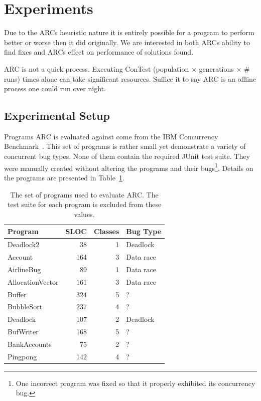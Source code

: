 \documentclass[10pt, conference, compsocconf]{IEEEtran}
\begin{document}
\section{Experiments}
\label{sec:experiments}

Due to the ARCs heuristic nature it is entirely possible for a program to perform better or worse then it did originally. We are interested in both
ARCs ability to find fixes and ARCs effect on performance of solutions found.

ARC is not a quick process.  Executing ConTest (population $\times$ generations $\times$ \# runs) times alone can take significant resources. Suffice it to say ARC is an offline process one could run over night.

\subsection{Experimental Setup}
\label{sec:experimental_setup}

Programs ARC is evaluated against come from the IBM Concurrency Benchmark~\cite{EHSU06}. This set of programs is rather small yet demonstrate a variety of concurrent bug types. None of them contain the required JUnit test suite.  They were manually created without altering the programs and their bugs\footnote{One incorrect program was fixed so that it properly exhibited its concurrency bug.}. Details on the programs are presented in Table~\ref{tbl:used_programs}.

\begin{table}[!h]
\begin{center}
\begin{tabular}{|l|r|r|l|}
\hline
\textbf{Program} &
\textbf{SLOC} &
\textbf{Classes} &
\textbf{Bug Type}
\\\hline
Deadlock2 & 38 & 1 & Deadlock
\\\hline
Account & 164 & 3 & Data race
\\\hline
AirlineBug & 89 & 1 & Data race
\\\hline
AllocationVector & 161 & 3 & Data race
\\\hline
Buffer & 324 & 5 & ?
\\\hline
BubbleSort & 237 & 4 & ?
\\\hline
Deadlock & 107 & 2 & Deadlock
\\\hline
BufWriter& 168 & 5 & ?
\\\hline
BankAccounts & 75 & 2 & ?
\\\hline
Pingpong & 142 & 4 & ?
\\\hline
\end{tabular}
\caption{The set of programs used to evaluate ARC. The test suite for each
program is excluded from these values.}
\label{tbl:used_programs}
\end{center}
\end{table}
\end{document}
